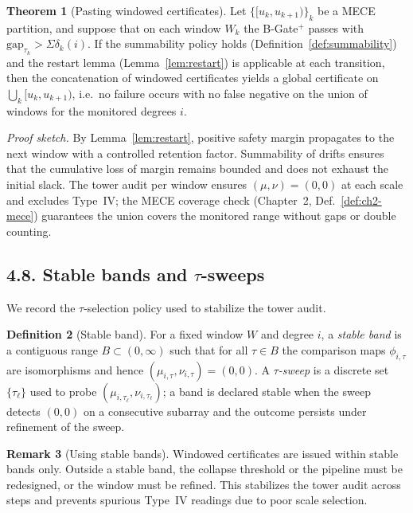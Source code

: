 \documentclass[11pt]{article}
\numberwithin{equation}{section}
\theoremstyle{plain}
\theoremstyle{definition}
\theoremstyle{remark}
\theoremstyle{plain}
\theoremstyle{definition}
\numberwithin{equation}{section}
\newtheorem{theorem}{Theorem}[section]
\theoremstyle{definition}
\newtheorem{definition}[theorem]{Definition}
\newtheorem{remark}[theorem]{Remark}
\numberwithin{equation}{section}
\theoremstyle{plain}
\theoremstyle{definition}
\theoremstyle{remark}
\begin{document}
\begin{theorem}[Pasting windowed certificates]\label{thm:pasting}
Let $\{[u_k,u_{k+1})\}_k$ be a MECE partition, and suppose that on each window $W_k$ the B-Gate$^{+}$ passes with $\mathrm{gap}_{\tau_k}>\Sigma\delta_k(i)$. If the summability policy holds (Definition~\ref{def:summability}) and the restart lemma (Lemma~\ref{lem:restart}) is applicable at each transition, then the concatenation of windowed certificates yields a global certificate on $\bigcup_k [u_k,u_{k+1})$, i.e.\ no failure occurs with no false negative on the union of windows for the monitored degrees $i$.
\end{theorem}

\noindent\emph{Proof sketch.} By Lemma~\ref{lem:restart}, positive safety margin propagates to the next window with a controlled retention factor. Summability of drifts ensures that the cumulative loss of margin remains bounded and does not exhaust the initial slack. The tower audit per window ensures $(\mu,\nu)=(0,0)$ at each scale and excludes Type~IV; the MECE coverage check (Chapter~2, Def.~\ref{def:ch2-mece}) guarantees the union covers the monitored range without gaps or double counting.

\subsection*{4.8. Stable bands and $\tau$-sweeps}
We record the $\tau$-selection policy used to stabilize the tower audit.

\begin{definition}[Stable band]\label{def:stable-band}
For a fixed window $W$ and degree $i$, a \emph{stable band} is a contiguous range $B\subset (0,\infty)$ such that for all $\tau\in B$ the comparison maps $\phi_{i,\tau}$ are isomorphisms and hence $(\mu_{i,\tau},\nu_{i,\tau})=(0,0)$. A \emph{$\tau$-sweep} is a discrete set $\{\tau_\ell\}$ used to probe $(\mu_{i,\tau_\ell},\nu_{i,\tau_\ell})$; a band is declared stable when the sweep detects $(0,0)$ on a consecutive subarray and the outcome persists under refinement of the sweep.
\end{definition}

\begin{remark}[Using stable bands]
Windowed certificates are issued within stable bands only. Outside a stable band, the collapse threshold or the pipeline must be redesigned, or the window must be refined. This stabilizes the tower audit across steps and prevents spurious Type~IV readings due to poor scale selection.
\end{remark}
\end{document}
